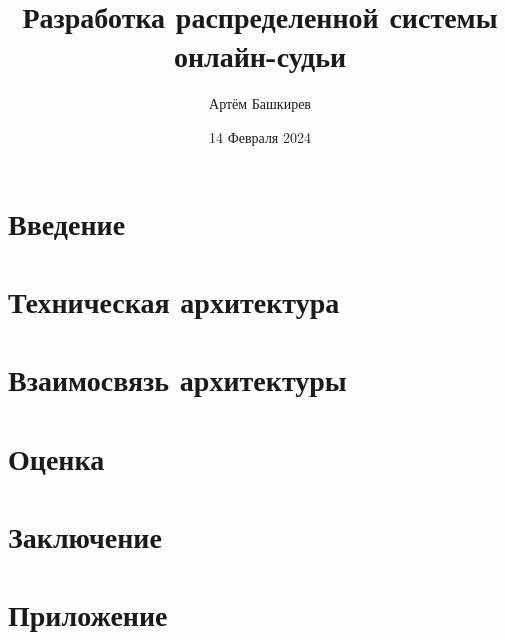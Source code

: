 \documentclass[a4paper, 12pt]{article}
\title{Разработка распределенной системы онлайн-судьи}
\author{Артём Башкирев}
\date{14 Февраля 2024}
\begin{document}
\maketitle
\thispagestyle{empty}

\newpage
    \tableofcontents
\newpage


    \section{Введение}
    
\newpage

    \section{Техническая архитектура}
    
\newpage

    \section{Взаимосвязь архитектуры}
    
\newpage

    \section{Оценка}
    
\newpage

    \section{Заключение}
    
\newpage

    \section{Приложение}
    
\end{document}
